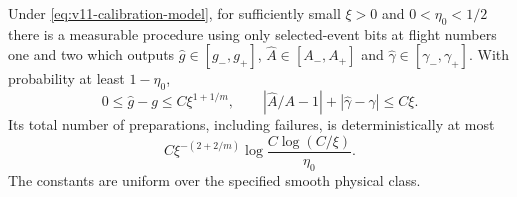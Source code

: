 \begin{lemma}
\label{lem:v11-calibration}
Under \eqref{eq:v11-calibration-model}, for sufficiently small
$\xi>0$ and $0<\eta_0<1/2$ there is a measurable procedure using
only selected-event bits at flight numbers one and two which outputs
$\widehat g\in[g_-,g_+]$, $\widehat A\in[A_-,A_+]$ and
$\widehat\gamma\in[\gamma_-,\gamma_+]$. With probability at
least $1-\eta_0$,
\begin{equation}\label{eq:v11-calibration-accuracy}
 0\le\widehat g-g\le C\xi^{1+1/m},\qquad
 |\widehat A/A-1|+|\widehat\gamma-\gamma|\le C\xi.
\end{equation}
Its total number of preparations, including failures, is
deterministically at most
\begin{equation}\label{eq:v11-calibration-cost}
 C\xi^{-(2+2/m)}
                   \log\frac{C\log(C/\xi)}{\eta_0}.
\end{equation}
The constants are uniform over the specified smooth physical class.
\end{lemma}
